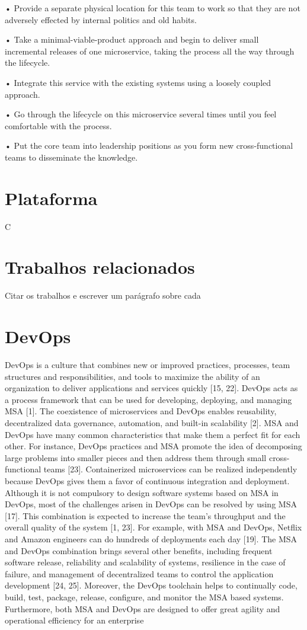 •	 Provide a separate physical location for this team to work so that they are not adversely effected by internal politics and old habits.

•	 Take a minimal-viable-product approach and begin to deliver small incremental releases of one microservice, taking the process all the way through the lifecycle.

•	 Integrate this service with the existing systems using a loosely coupled approach.

•	 Go through the lifecycle on this microservice several times until you feel comfortable with the process.

•	 Put the core team into leadership positions as you form new cross-functional teams to disseminate the knowledge.

\section*{Plataforma}

C

\section{Trabalhos relacionados}

Citar os trabalhos e escrever um parágrafo sobre cada

\section{DevOps}
\label{devops}

DevOps is a culture that combines new or improved practices, processes, team structures and responsibilities, and tools to maximize the ability of an organization to deliver applications and services quickly [15, 22]. DevOps acts as a process framework that can be used for developing, deploying, and managing MSA [1]. The coexistence of microservices and DevOps enables reusability, decentralized data governance, automation, and built-in scalability [2]. MSA and DevOps have many common characteristics that make them a perfect fit for each other. For instance, DevOps practices and MSA promote the idea of decomposing large problems into smaller pieces and then address them through small cross-functional teams [23]. Containerized microservices can be realized independently because DevOps gives them a favor of continuous integration and deployment. Although it is not compulsory to design software systems based on MSA in DevOps, most of the challenges arisen in DevOps can be resolved by using MSA [17]. This combination is expected to increase the team’s throughput and the overall quality of the system [1, 23]. For example, with MSA and DevOps, Netflix and Amazon engineers can do hundreds of deployments each day [19]. The MSA and DevOps combination brings several other benefits, including frequent software release, reliability and scalability of systems, resilience in the case of failure, and management of decentralized teams to control the application development [24, 25]. Moreover, the DevOps toolchain helps to continually code, build, test, package, release, configure, and monitor the MSA based systems. Furthermore, both MSA and DevOps are designed to offer great agility and operational efficiency for an enterprise
